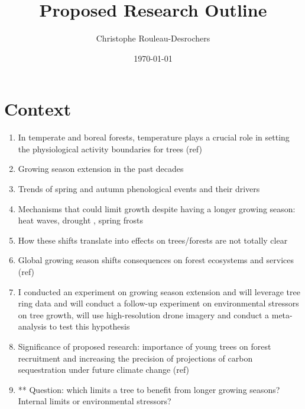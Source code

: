 \documentclass{article}
\title{Proposed Research Outline}
\date{\today}
\author{Christophe Rouleau-Desrochers}
\begin{document}

\maketitle



\section{Context}
\begin {enumerate}
	\item In temperate and boreal forests, temperature plays a crucial role in setting the physiological activity boundaries for trees (ref)
	\item Growing season extension in the past decades \citep{korner_phenology_2010,menzel_growing_1999}
	\item Trends of spring and autumn phenological events and their drivers \citep{walther_ecological_2002}
	\item Mechanisms that could limit growth despite having a longer growing season: heat waves, drought \citep{tyree_xylem_2002, choat_triggers_2018, li_widespread_2023, trenberth_global_2014,intergovernmental_panel_on_climate_change_detection_2014,chiang_evidence_2021}, spring frosts \citep{polgar_leafout_2011,reinmann_compensatory_2023}
	\item How these shifts translate into effects on trees/forests are not totally clear \citep{estiarte_alteration_2015,keenan_net_2014,gunderson_forest_2012,piao_plant_2019,dow_warm_2022}
	\item Global growing season shifts consequences on forest ecosystems and services (ref)
	\item I conducted an experiment on growing season extension and will leverage tree ring data and will conduct a follow-up experiment on environmental stressors on tree growth, will use high-resolution drone imagery and conduct a meta-analysis to test this hypothesis
	\item Significance of proposed research: importance of young trees on forest recruitment and increasing the precision of projections of carbon sequestration under future climate change (ref)
	\item** Question: which limits a tree to benefit from longer growing seasons? Internal limits or environmental stressors?
\end {enumerate}
\end{document}
